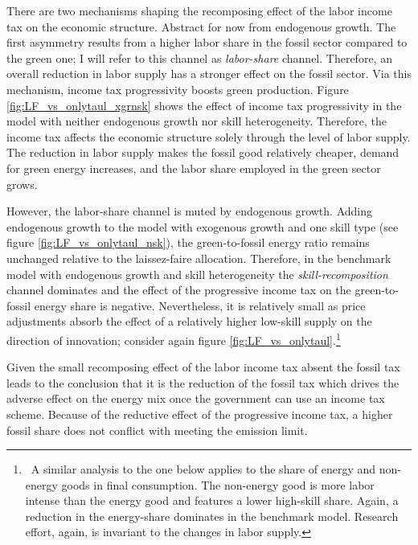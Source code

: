 There are two mechanisms shaping the recomposing effect of the labor income tax on the economic structure. Abstract for now from endogenous growth.
The first asymmetry results from a higher labor share in the fossil sector compared to the green one; I will refer to this channel as \textit{labor-share} channel. Therefore, an overall reduction in labor supply has a stronger effect on the fossil sector. Via this mechanism, income tax progressivity boosts green production. Figure \ref{fig:LF_vs_onlytaul_xgrnsk} shows the effect of income tax progressivity in the model with neither endogenous growth nor skill heterogeneity. Therefore, the income tax affects the economic structure solely through the level of labor supply. The reduction in labor supply makes the fossil good relatively cheaper, demand for green energy increases, and the labor share employed in the green sector grows.  

However, the labor-share channel is muted by endogenous growth. Adding endogenous growth to the model with exogenous growth and one skill type (see figure \ref{fig:LF_vs_onlytaul_nsk}), the green-to-fossil energy ratio remains unchanged relative to the laissez-faire allocation. 
Therefore, in the benchmark model with endogenous growth and skill heterogeneity the \textit{skill-recomposition} channel dominates and the effect of the progressive income tax on the green-to-fossil energy share is negative. Nevertheless, it is relatively small as price adjustments absorb the effect of a relatively higher low-skill supply on the direction of innovation; consider again figure \ref{fig:LF_vs_onlytaul}.\footnote{\ A similar analysis to the one below applies to the share of energy and non-energy goods in final consumption. The non-energy good is more labor intense than the energy good and features a lower high-skill share. Again, a reduction in the energy-share dominates in the benchmark model. Research effort, again, is invariant to the changes in labor supply. }

Given the small recomposing effect of the labor income tax absent the fossil tax leads to the conclusion that it is the reduction of the fossil tax which drives the adverse effect on the energy mix once the government can use an income tax scheme. 
Because of the reductive effect of the progressive income tax, a higher fossil share does not conflict with meeting the emission limit. 

